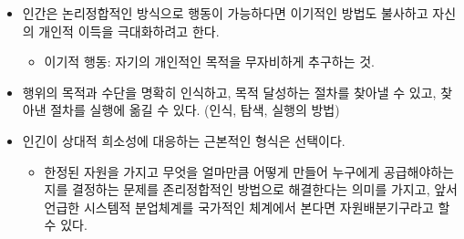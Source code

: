 \documentclass{report}
\begin{document}
\begin{itemize}
\begin{itemize}
\begin{itemize}
\begin{itemize}
\begin{itemize}
\begin{itemize}
                        \item 인간은 논리정합적인 방식으로 행동이 가능하다면 이기적인 방법도 불사하고 자신의 개인적 이득을 극대화하려고 한다.
                        \begin{itemize}
                            \item 이기적 행동: 자기의 개인적인 목적을 무자비하게 추구하는 것.
                        \end{itemize}
                        \item 행위의 목적과 수단을 명확히 인식하고, 목적 달성하는 절차를 찾아낼 수 있고, 찾아낸 절차를 실행에 옮길 수 있다. (인식, 탐색, 실행의 방법)
                        \item 인긴이 상대적 희소성에 대응하는 근본적인 형식은 선택이다.
                        \begin{itemize}
                            \item 한정된 자원을 가지고 무엇을 얼마만큼 어떻게 만들어 누구에게 공급해야하는지를 결정하는 문제를 존리정합적인 방법으로 해결한다는 의미를 가지고, 앞서 언급한 시스템적 분업체계를 국가적인 체계에서 본다면 자원배분기구라고 할 수 있다.
                        \end{itemize}
                    \end{itemize}
                \end{itemize}
            \end{itemize}
        \end{itemize}
    \end{itemize}
\end{itemize}
\end{document}
